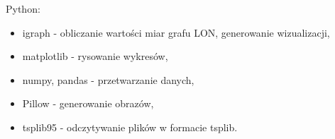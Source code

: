 Python:
\begin{itemize}
    \item igraph - obliczanie wartości miar grafu LON, generowanie wizualizacji,
    \item matplotlib - rysowanie wykresów,
    \item numpy, pandas - przetwarzanie danych,
    \item Pillow - generowanie obrazów,
    \item tsplib95 - odczytywanie plików w formacie tsplib.
\end{itemize}

